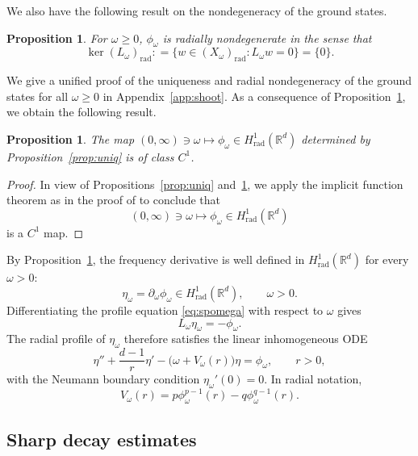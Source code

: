 \documentclass[12pt, a4paper, reqno]{amsart}
\numberwithin{equation}{section}
\newtheorem{proposition}[theorem]{Proposition}
\theoremstyle{definition}
\theoremstyle{remark}
\newcommand{\R}{\mathbb R}
\newcommand{\rad}{\mathrm{rad}}
\newcommand{\pt}{\partial}
\newcommand{\ce}{\mathrel{\mathop:}=}
\begin{document}
We also have the following result on the nondegeneracy of the ground states.

\begin{proposition}\label{prop:nondeg}
For $\omega\ge 0$, $\phi_\omega$ is radially nondegenerate in the sense that
\[  \ker (L_\omega)_{\rad}
    \ce \{w\in (X_\omega)_{\rad}:
    L_\omega w=0\}=\{0\}.   \]
\end{proposition}

We give a unified proof of the uniqueness and radial nondegeneracy of the ground states for all $\omega\ge0$ in Appendix~\ref{app:shoot}.
As a consequence of Proposition~\ref{prop:nondeg}, we obtain the following result.
\begin{proposition} \label{prop:reg}
The map $(0,\infty)\ni\omega\mapsto\phi_\omega\in H_{\rad}^1(\R^d)$ determined by Proposition~\ref{prop:uniq} is of class $C^1$.
\end{proposition}

\begin{proof}
In view of Propositions~\ref{prop:uniq} and~\ref{prop:nondeg},
we apply the implicit function theorem as in the proof of
\cite[Theorem~18]{SS85} to conclude that
\[
  (0,\infty)\ni\omega\mapsto\phi_\omega\in H_{\rad}^1(\R^d)
\]
is a $C^1$ map.
\end{proof}

By Proposition~\ref{prop:reg}, the frequency derivative is well defined
in $H_{\rad}^1(\R^d)$ for every $\omega>0$:
\begin{equation}
 \label{eq:eta-def}
    \eta_\omega
    = \pt_\omega\phi_\omega\in H_{\rad}^1(\R^d),\qquad
    \omega>0.
\end{equation}
Differentiating the profile equation \eqref{eq:spomega} with respect
to $\omega$ gives
\begin{equation}\label{eq:Lometa}
  L_\omega\eta_\omega=-\phi_\omega.
\end{equation}
The radial profile of $\eta_\omega$ therefore satisfies the linear inhomogeneous ODE
\begin{equation}
\label{eq:etaode}
    \eta''
    +\frac{d-1}{r}\eta'
    -\bigl(\omega+V_\omega(r)\bigr)\eta
    =\phi_\omega,\qquad
    r>0,
\end{equation}
with the Neumann boundary condition $\eta_\omega'(0)=0$. In radial notation,
\begin{equation*}
    V_\omega(r)
    =p\phi_\omega^{p-1}(r)-q\phi_\omega^{q-1}(r).
\end{equation*}

\subsection{Sharp decay estimates}
\end{document}
